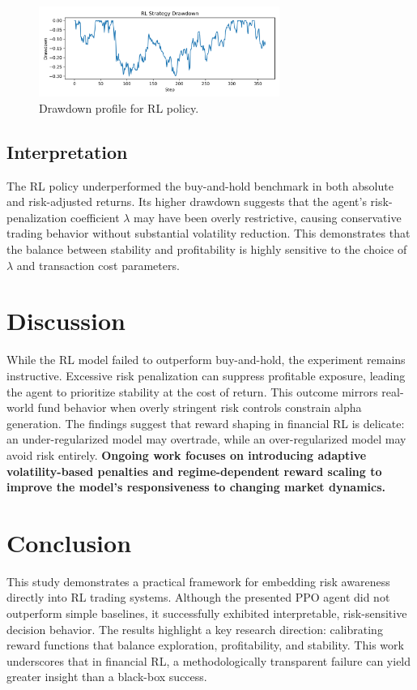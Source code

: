 \documentclass[12pt]{article}
\begin{document}
\begin{figure}[H]
\centering
\includegraphics[width=0.7\textwidth]{experiments/plots/drawdown_rl.png}
\caption{Drawdown profile for RL policy.}
\end{figure}

\subsection{Interpretation}
The RL policy underperformed the buy-and-hold benchmark in both absolute and risk-adjusted returns. Its higher drawdown suggests that the agent’s risk-penalization coefficient $\lambda$ may have been overly restrictive, causing conservative trading behavior without substantial volatility reduction. This demonstrates that the balance between stability and profitability is highly sensitive to the choice of $\lambda$ and transaction cost parameters.

\section{Discussion}
While the RL model failed to outperform buy-and-hold, the experiment remains instructive. Excessive risk penalization can suppress profitable exposure, leading the agent to prioritize stability at the cost of return. This outcome mirrors real-world fund behavior when overly stringent risk controls constrain alpha generation. The findings suggest that reward shaping in financial RL is delicate: an under-regularized model may overtrade, while an over-regularized model may avoid risk entirely. \textbf{Ongoing work focuses on introducing adaptive volatility-based penalties and regime-dependent reward scaling to improve the model's responsiveness to changing market dynamics.}

\section{Conclusion}
This study demonstrates a practical framework for embedding risk awareness directly into RL trading systems. Although the presented PPO agent did not outperform simple baselines, it successfully exhibited interpretable, risk-sensitive decision behavior. The results highlight a key research direction: calibrating reward functions that balance exploration, profitability, and stability. This work underscores that in financial RL, a methodologically transparent failure can yield greater insight than a black-box success.
\end{document}
